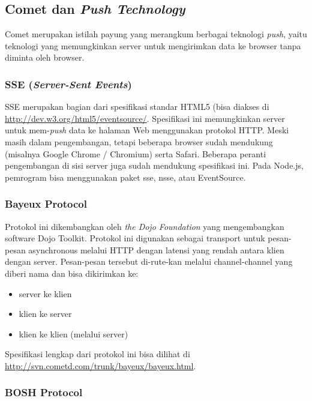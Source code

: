 \subsection{Comet dan \textit{Push Technology}}

Comet merupakan istilah payung yang merangkum berbagai teknologi \textit{push}, yaitu teknologi yang memungkinkan server untuk mengirimkan data ke browser tanpa diminta oleh browser.

\subsubsection{SSE (\textit{Server-Sent Events})}

SSE merupakan bagian dari spesifikasi standar HTML5 (bisa diakses di \url{http://dev.w3.org/html5/eventsource/}. Spesifikasi ini memungkinkan server untuk mem-\textit{push} data ke halaman Web menggunakan protokol HTTP. Meski masih dalam pengembangan, tetapi beberapa browser sudah mendukung (misalnya Google Chrome / Chromium) serta Safari. Beberapa peranti pengembangan di sisi server juga sudah mendukung spesifikasi ini. Pada Node.js, pemrogram bisa menggunakan paket sse, nsse, atau EventSource.

\subsubsection{Bayeux Protocol}

Protokol ini dikembangkan oleh \textit{the Dojo Foundation} yang mengembangkan software Dojo Toolkit. Protokol ini digunakan sebagai transport untuk pesan-pesan asynchronous melalui HTTP dengan latensi yang rendah antara klien dengan server. Pesan-pesan tersebut di-rute-kan melalui channel-channel yang diberi nama dan bisa dikirimkan ke:
\begin{itemize}
	\item server ke klien
	\item klien ke server
	\item klien ke klien (melalui server)
\end{itemize}

Spesifikasi lengkap dari protokol ini bisa dilihat di \url{http://svn.cometd.com/trunk/bayeux/bayeux.html}.

\subsubsection{BOSH Protocol}

